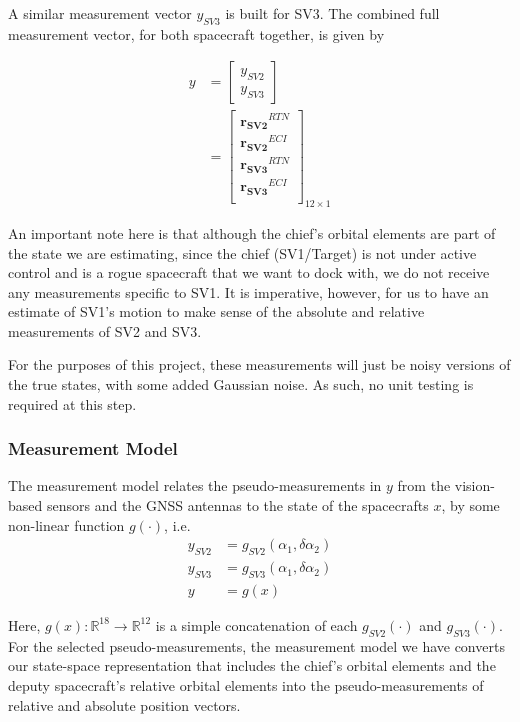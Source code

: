 A similar measurement vector $y_{SV3}$ is built for SV3. The combined full measurement vector, for both spacecraft together, is given by

\begin{align}
    y &= \begin{bmatrix}
        y_{SV2} \\
        y_{SV3}
    \end{bmatrix} \\
    &= \begin{bmatrix}
        \boldsymbol{r_{SV2}}^{RTN}\\
        \boldsymbol{r_{SV2}}^{ECI} \\
        \boldsymbol{r_{SV3}}^{RTN} \\
        \boldsymbol{r_{SV3}}^{ECI} \\
    \end{bmatrix}_{12\times 1}
\end{align}

An important note here is that although the chief's orbital elements are part of the state we are estimating, since the chief (SV1/Target) is not under active control and is a rogue spacecraft that we want to dock with, we do not receive any measurements specific to SV1. It is imperative, however, for us to have an estimate of SV1's motion to make sense of the absolute and relative measurements of SV2 and SV3.

For the purposes of this project, these measurements will just be noisy versions of the true states, with some added Gaussian noise. As such, no unit testing is required at this step.

\subsubsection{Measurement Model}
The measurement model relates the pseudo-measurements in $y$ from the vision-based sensors and the GNSS antennas to the state of the spacecrafts $x$, by some non-linear function $g(\cdot)$, i.e.
\begin{align}
    y_{SV2} &= g_{SV2}(\alpha_{1}, \delta \alpha _{2}) \\
    y_{SV3} &= g_{SV3}(\alpha_{1}, \delta \alpha _{2}) \\
    y &= g(x)
\end{align}

Here, $g(x):\mathbb{R}^{18} \rightarrow \mathbb{R}^{12}$ is a simple concatenation of each $g_{SV2}(\cdot)$ and $g_{SV3}(\cdot)$. For the selected pseudo-measurements, the measurement model we have converts our state-space representation that includes the chief's orbital elements and the deputy spacecraft's relative orbital elements into the pseudo-measurements of relative and absolute position vectors.

